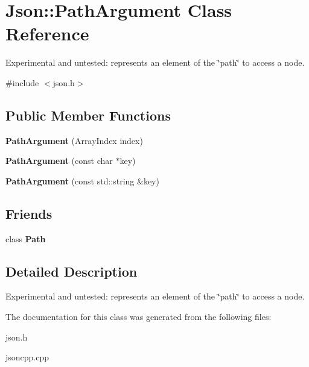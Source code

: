 \hypertarget{class_json_1_1_path_argument}{\section{Json\-:\-:Path\-Argument Class Reference}
\label{class_json_1_1_path_argument}
}


Experimental and untested\-: represents an element of the \char`\"{}path\char`\"{} to access a node.  




{\ttfamily \#include $<$json.\-h$>$}

\subsection*{Public Member Functions}
\begin{DoxyCompactItemize}
\item 
\hypertarget{class_json_1_1_path_argument_a53c5b27143b161301b95fd544c139ecf}{{\bfseries Path\-Argument} (Array\-Index index)}\label{class_json_1_1_path_argument_a53c5b27143b161301b95fd544c139ecf}

\item 
\hypertarget{class_json_1_1_path_argument_a9690417a8a40e6e49f2acdf6c9281345}{{\bfseries Path\-Argument} (const char $\ast$key)}\label{class_json_1_1_path_argument_a9690417a8a40e6e49f2acdf6c9281345}

\item 
\hypertarget{class_json_1_1_path_argument_a08f872cfee4fc600f7fa3bcaaff0d41c}{{\bfseries Path\-Argument} (const std\-::string \&key)}\label{class_json_1_1_path_argument_a08f872cfee4fc600f7fa3bcaaff0d41c}

\end{DoxyCompactItemize}
\subsection*{Friends}
\begin{DoxyCompactItemize}
\item 
\hypertarget{class_json_1_1_path_argument_a4877239a6b7f09fbf5a61ca68a49d74c}{class {\bfseries Path}}\label{class_json_1_1_path_argument_a4877239a6b7f09fbf5a61ca68a49d74c}

\end{DoxyCompactItemize}


\subsection{Detailed Description}
Experimental and untested\-: represents an element of the \char`\"{}path\char`\"{} to access a node. 

The documentation for this class was generated from the following files\-:\begin{DoxyCompactItemize}
\item 
json.\-h\item 
jsoncpp.\-cpp\end{DoxyCompactItemize}
